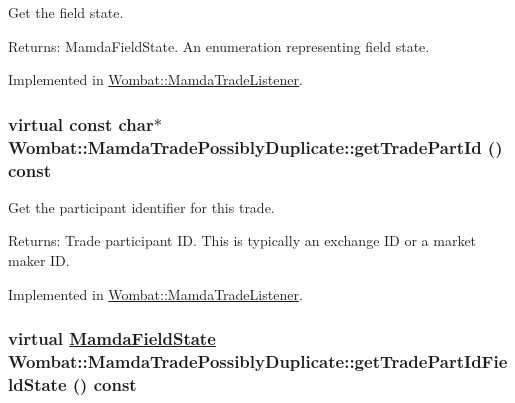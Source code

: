 Get the field state. 

\begin{Desc}
\item[Returns:]Mamda\-Field\-State. An enumeration representing field state. \end{Desc}


Implemented in \hyperlink{classWombat_1_1MamdaTradeListener_5fa909b1c87c6380e204dba43ab9baa7}{Wombat::Mamda\-Trade\-Listener}.\hypertarget{classWombat_1_1MamdaTradePossiblyDuplicate_72a73e8ae29f30d81b3d78401f96589b}{
\subsubsection[getTradePartId]{\setlength{\rightskip}{0pt plus 5cm}virtual const char$\ast$ Wombat::Mamda\-Trade\-Possibly\-Duplicate::get\-Trade\-Part\-Id () const}}
\label{classWombat_1_1MamdaTradePossiblyDuplicate_72a73e8ae29f30d81b3d78401f96589b}


Get the participant identifier for this trade. 

\begin{Desc}
\item[Returns:]Trade participant ID. This is typically an exchange ID or a market maker ID. \end{Desc}


Implemented in \hyperlink{classWombat_1_1MamdaTradeListener_a9e5a20840963992b58ec19cf717cfab}{Wombat::Mamda\-Trade\-Listener}.\hypertarget{classWombat_1_1MamdaTradePossiblyDuplicate_67970ff40f57b63e0ef46f280947a641}{
\subsubsection[getTradePartIdFieldState]{\setlength{\rightskip}{0pt plus 5cm}virtual \hyperlink{namespaceWombat_93aac974f2ab713554fd12a1fa3b7d2a}{Mamda\-Field\-State} Wombat::Mamda\-Trade\-Possibly\-Duplicate::get\-Trade\-Part\-Id\-Field\-State () const}}
\label{classWombat_1_1MamdaTradePossiblyDuplicate_67970ff40f57b63e0ef46f280947a641}


